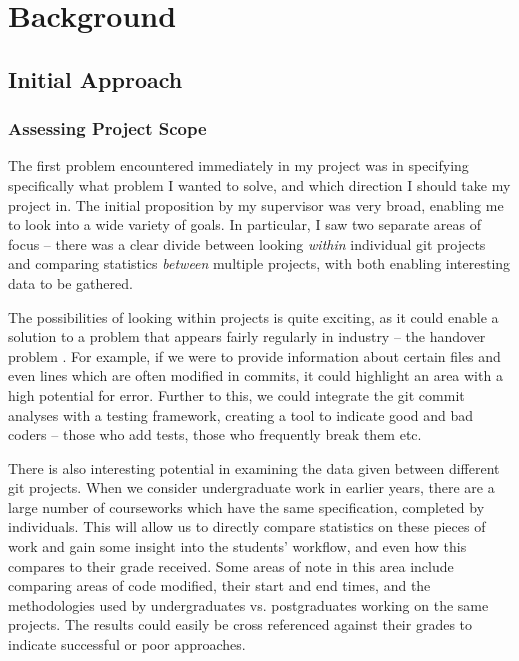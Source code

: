 \chapter{Background}

\label{Chapter2}



\section{Initial Approach}

\subsection{Assessing Project Scope}
The first problem encountered immediately in my project was in specifying
specifically what problem I wanted to solve, and which direction I should take
my project in. The initial proposition by my supervisor was very broad, 
enabling me to look into a wide variety of goals. In particular, I saw two separate areas
of focus -- there was a clear divide between looking \emph{within} individual git 
projects and comparing statistics \emph{between} multiple projects, with both 
enabling interesting data to be gathered. 

The possibilities of looking within projects is quite exciting, as it could enable a solution
to a problem that appears fairly regularly in industry -- the handover problem \cite{handover}.
For example, if we were to provide information about certain files and even lines which are 
often modified in commits, it could highlight an area with a high potential for error.
Further to this, we could integrate the git commit analyses with a testing
framework, creating a tool to indicate good and bad coders -- those who add
tests, those who frequently break them etc.

There is also interesting potential in examining the data given between different
git projects. When we consider undergraduate work in earlier years, there are a
large number of courseworks which have the same specification, completed by 
individuals. This will allow us to directly compare statistics on these pieces
of work and gain some insight into the students' workflow, and even how this
compares to their grade received. Some areas of note in this area include comparing
areas of code modified, their start and end times, and the methodologies used
by undergraduates vs. postgraduates working on the same projects. The results
could easily be cross referenced against their grades to indicate successful
or poor approaches.

